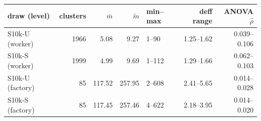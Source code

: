 \begin{tabular}{@{}lrrrlrr@{}}
\toprule
draw (level) & clusters & $\bar{m}$ & $\tilde{m}$ & min--max & deff range & ANOVA $\hat{\rho}$ \\
\midrule
S10k-U (worker) & 1966 & 5.08 & 9.27 & 1--90 & 1.25--1.62 & 0.039--0.106 \\
S10k-S (worker) & 1999 & 4.99 & 9.69 & 1--112 & 1.29--1.66 & 0.062--0.103 \\
\midrule
S10k-U (factory) & 85 & 117.52 & 257.95 & 2--608 & 2.41--5.65 & 0.014--0.028 \\
S10k-S (factory) & 85 & 117.45 & 257.46 & 4--622 & 2.18--3.95 & 0.014--0.020 \\
\bottomrule
\end{tabular}
